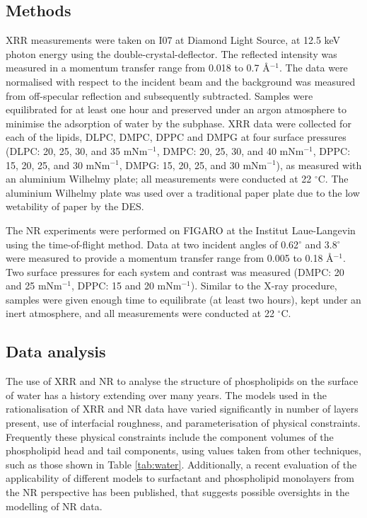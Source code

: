 \documentclass[twoside,twocolumn,9pt]{article}
\begin{document}
\subsection{Methods}
XRR measurements were taken on I07 at Diamond Light Source, at 12.5 keV photon energy using the double-crystal-deflector.\cite{Arnold2012} The reflected intensity was measured in a momentum transfer range from 0.018 to 0.7 \AA$^{-1}$. The data were normalised with respect to the incident beam and the background was measured from off-specular reflection and subsequently subtracted. Samples were equilibrated for at least one hour and preserved under an argon atmosphere to minimise the adsorption of water by the subphase. XRR data were collected for each of the lipids, DLPC, DMPC, DPPC and DMPG at four surface pressures (DLPC: 20, 25, 30, and 35 mNm$^{-1}$, DMPC: 20, 25, 30, and 40 mNm$^{-1}$, DPPC: 15, 20, 25, and 30 mNm$^{-1}$, DMPG: 15, 20, 25, and 30 mNm$^{-1}$), as measured with an aluminium Wilhelmy plate; all measurements were conducted at 22 $^\circ$C. The aluminium Wilhelmy plate was used over a traditional paper plate due to the low wetability of paper by the DES.

The NR experiments were performed on FIGARO at the Institut Laue-Langevin using the time-of-flight method.\cite{Campbell2011} Data at two incident angles of 0.62$^\circ$ and 3.8$^\circ$ were measured to provide a momentum transfer range from 0.005 to 0.18 \AA$^{-1}$. Two surface pressures for each system and contrast was measured (DMPC: 20 and 25 mNm$^{-1}$, DPPC: 15 and 20 mNm$^{-1}$). Similar to the X-ray procedure, samples were given enough time to equilibrate (at least two hours), kept under an inert atmosphere, and all measurements were conducted at 22 $^\circ$C.

\subsection{Data analysis}
The use of XRR and NR to analyse the structure of phospholipids on the surface of water has a history extending over many years.\cite{Mohwald1990,Kewalramani2010,Bayerl1990,Johnson1991,Clifton2012,Helm1987,Daillant1990} The models used in the rationalisation of XRR and NR data have varied significantly in number of layers present, use of interfacial roughness, and parameterisation of physical constraints. Frequently these physical constraints include the component volumes of the phospholipid head and tail components, using values taken from other techniques, such as those shown in Table \ref{tab:water}. Additionally, a recent evaluation of the applicability of different models to surfactant and phospholipid monolayers from the NR perspective has been published,\cite{Campbell2018} that suggests possible oversights in the modelling of NR data.
\end{document}
